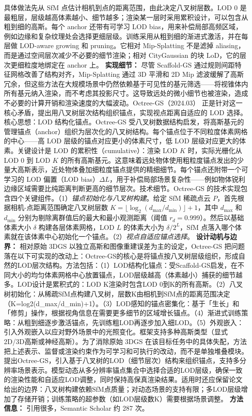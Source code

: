 具体做法先从 SfM 点估计相机到点的距离范围，由此决定八叉树层数。LOD 0 是最粗层，层级越高体素越小、细节越多；渲染某一层时采用累积设计，可以包含从粗到细的高斯。每个 anchor 还带有可学习 LOD bias，用来补偿局部高频区域，例如边缘和复杂纹理处会选择更细层级。训练采用从粗到细的渐进式激活，并在每层做 LOD-aware growing 和 pruning。它相对 Mip-Splatting 不是滤掉 aliasing，而是通过空间层次减少不必要的细节渲染；相对 CityGaussian 的块 LoD，它的层次更细粒度地绑定在 anchor 上。
\textbf{实现细节：} 尽管 Scaffold-GS 通过规则间距特征网格改善了结构对齐，Mip-Splatting 通过 3D 平滑和 2D Mip 滤波缓解了高斯冗余，但这些方法在大规模场景中仍然依赖基于可见性的基元筛选——将视锥体内所有基元纳入渲染，而不考虑其投影尺寸。这导致远处的微小细节也被渲染，造成不必要的计算开销和渲染速度的大幅波动。Octree-GS（2024.03） 正是针对这一核心矛盾，提出用八叉树层次结构组织锚点，实现视点距离自适应的 LOD 选择。核心思想：LOD 结构化锚点。Octree-GS 受八叉树数据结构启发，将高斯基元的管理锚点（anchor）组织为层次化的八叉树结构。每个锚点位于不同粒度体素网格的中心——高 LOD 层级的锚点对应更小的体素尺寸，低 LOD 层级对应更大的体素。关键设计是 LOD 的累积性（cumulative）：渲染 LOD $K$ 时，实际光栅化从 LOD 0 到 LOD $K$ 的所有高斯基元。这意味着远处物体使用粗粒度锚点发出的少量大高斯表示，近处物体叠加细粒度锚点提供的精细细节。每个锚点还附带一个可学习的 LOD 偏置（LOD bias）$\Delta L$，用于补偿局部场景复杂性——例如物体锐利边缘区域需要比纯距离判断更高的细节层次。技术细节。Octree-GS 的技术实现包含四个关键组件。（1）\textit{锚点初始化与八叉树构建}。给定 SfM 稀疏点云 $P$，首先根据相机-点距离范围确定八叉树层数 $K = \lfloor\log_2(d_{\max}/d_{\min})\rfloor + 1$，其中 $d_{\max}$ 和 $d_{\min}$ 分别为剔除离群值后的最大和最小观测距离（阈值 $r_d = 0.999$）。然后以基础体素大小 $\delta$ 构建各层体素网格，LOD $L$ 的体素大小为 $\delta / 2^L$，SfM 点落入哪个体素就在该体素中心初始化一个锚点。（2）\textit{视点自适应锚点选择}。
\textbf{设计动机与边界：} 相对原始 3DGS 以独立高斯和图像重建误差为主的设定，Octree-GS 把问题落在以下可实现的改动上：Octree-GS的核心是将锚点按八叉树层级组织，形成自然的LOD层次结构。方法包括：（1）LOD结构化锚点：受Scaffold-GS启发，在不同大小的均匀体素网格中心放置锚点，LOD层级越高（体素越小）捕获的细节越多。LOD设计是累积式的：LOD K渲染时包含LOD 0到K的所有高斯。（2）八叉树初始化：从稀疏SfM点构建八叉树，层数K由相机到SfM点的距离范围决定（K=log2(d\_max/d\_min)+1）。（3）LOD感知的锚点密集化：基于「生长」和「修剪」操作，根据视角信息在需要更多细节的区域增长锚点。（4）渐进式训练策略：从粗到细逐步激活锚点，先训练粗LOD再逐步加入细LOD。（5）外观嵌入：引入外观嵌入以应对野外场景中的光照变化。框架支持多种高斯类型（显式2D/3D高斯或神经高斯）。为了消除原始 3DGS 在该目标任务中的具体失配，方法把上述表示、监督或渲染约束作为可学习和可执行的改动，而不是单独堆叠模块。提出Octree-GS，引入基于八叉树的LOD（细节层次）结构来组织锚点，支持多分辨率场景表示。模型动态从多分辨率锚点集合中选择合适的LOD层级，确保一致的渲染性能和自适应LOD调整，同时保持高保真渲染结果。适用时还应保留论文给出的边界：八叉树构建依赖SfM点质量；对动态场景的支持有限；多LOD层级增加了存储开销；训练策略的超参数（如LOD层级数K）需要根据场景调整。
\textbf{方法信息：} 引用很多，Semantic Scholar 约 287 次。



